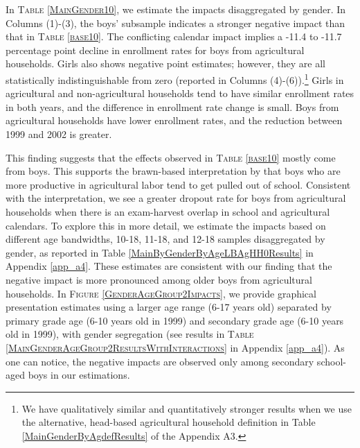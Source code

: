 \documentclass[12pt,letterpaper]{article}
\newcommand{\0}{\ensuremath{\mbox{\boldmath $0$}}}
\begin{document}
In \textsc{\small Table \ref{MainGender10}}, we estimate the impacts disaggregated by gender. In Columns (1)-(3), the boys' subsample indicates a stronger negative impact than that in \textsc{\small Table \ref{base10}}. The conflicting calendar impact implies a -11.4 to -11.7 percentage point decline in enrollment rates for boys from agricultural households. Girls also shows negative point estimates; however, they are all statistically indistinguishable from zero (reported in Columns (4)-(6)).\footnote{We have qualitatively similar and quantitatively stronger results when we use the alternative, head-based agricultural household definition in \textsf{\small Table \ref{MainGenderByAgdefResults}} of the Appendix A3.} Girls in agricultural and non-agricultural households tend to have similar enrollment rates in both years, and the difference in enrollment rate change is small. Boys from agricultural households have lower enrollment rates, and the reduction between 1999 and 2002 is greater. 

This finding suggests that the effects observed in \textsc{\small Table \ref{base10}} mostly come from boys. This supports the brawn-based interpretation by \cite{PittRosenzweigHassan2010} that boys who are more productive in agricultural labor tend to get pulled out of school. Consistent with the interpretation, we see a greater dropout rate for boys from agricultural households when there is an exam-harvest overlap in school and agricultural calendars. To explore this in more detail, we estimate the impacts based on different age bandwidths, 10-18, 11-18, and 12-18 samples disaggregated by gender, as reported in Table \ref{MainByGenderByAgeLBAgHH0Results} in Appendix \ref{app_a4}. These estimates are consistent with our finding that the negative impact is more pronounced among older boys from agricultural households. In \textsc{\small Figure \ref{GenderAgeGroup2Impacts}}, we provide graphical presentation estimates using a larger age range (6-17 years old) separated by primary grade age (6-10 years old in 1999) and secondary grade age (6-10 years old in 1999), with gender segregation (see results in \textsc{\small Table \ref{MainGenderAgeGroup2ResultsWithInteractions}} in Appendix \ref{app_a4}). As one can notice, the negative impacts are observed only among secondary school-aged boys in our estimations. 
\end{document}
